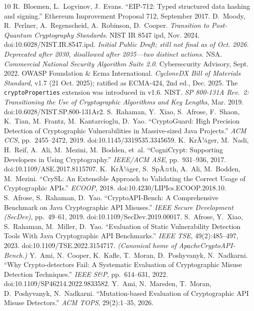 \documentclass[conference]{IEEEtran}
\newcommand{\code}[1]{\texttt{\small #1}}
\begin{document}
\begin{thebibliography}{10}
 R.~Bloemen, L.~Logvinov, J.~Evans. ``EIP-712: Typed structured data
hashing and signing.'' Ethereum Improvement Proposal 712, September 2017.
 D.~Moody, R.~Perlner, A.~Regenscheid, A.~Robinson, D.~Cooper.
\emph{Transition to Post-Quantum Cryptography Standards}. NIST IR 8547 ipd, Nov. 2024.
doi:10.6028/NIST.IR.8547.ipd. \textit{Initial Public Draft; still not final as of
Oct. 2026. Deprecated after 2030, disallowed after 2035---two distinct actions.}
 NSA. \emph{Commercial National Security Algorithm Suite 2.0}.
Cybersecurity Advisory, Sept. 2022.
 OWASP Foundation \& Ecma International. \emph{CycloneDX Bill of
Materials Standard}, v1.7 (21 Oct. 2025); ratified as ECMA-424, 2nd ed., Dec. 2025.
The \code{cryptoProperties} extension was introduced in v1.6.
 NIST. \emph{SP 800-131A Rev.~2: Transitioning the Use of Cryptographic
Algorithms and Key Lengths}, Mar. 2019. doi:10.6028/NIST.SP.800-131Ar2.
 S.~Rahaman, Y.~Xiao, S.~Afrose, F.~Shaon, K.~Tian, M.~Frantz,
M.~Kantarcioglu, D.~Yao. ``CryptoGuard: High Precision Detection of Cryptographic
Vulnerabilities in Massive-sized Java Projects.'' \emph{ACM CCS}, pp.~2455--2472, 2019.
doi:10.1145/3319535.3345659.
 K.~KrÃ¼ger, M.~Nadi, H.~Reif, A.~Ali, M.~Mezini, M.~Bodden, et~al.
``CogniCrypt: Supporting Developers in Using Cryptography.'' \emph{IEEE/ACM ASE},
pp.~931--936, 2017. doi:10.1109/ASE.2017.8115707.
 K.~KrÃ¼ger, S.~SpÃ¤th, A.~Ali, M.~Bodden, M.~Mezini. ``CrySL: An Extensible
Approach to Validating the Correct Usage of Cryptographic APIs.'' \emph{ECOOP}, 2018.
doi:10.4230/LIPIcs.ECOOP.2018.10.
 S.~Afrose, S.~Rahaman, D.~Yao. ``CryptoAPI-Bench: A Comprehensive
Benchmark on Java Cryptographic API Misuses.'' \emph{IEEE Secure Development (SecDev)},
pp.~49--61, 2019. doi:10.1109/SecDev.2019.00017.
 S.~Afrose, Y.~Xiao, S.~Rahaman, M.~Miller, D.~Yao. ``Evaluation of
Static Vulnerability Detection Tools With Java Cryptographic API Benchmarks.''
\emph{IEEE TSE}, 49(2):485--497, 2023. doi:10.1109/TSE.2022.3154717.
\textit{(Canonical home of ApacheCryptoAPI-Bench.)}
 Y.~Ami, N.~Cooper, K.~Kafle, T.~Moran, D.~Poshyvanyk, N.~Nadkarni.
``Why Crypto-detectors Fail: A Systematic Evaluation of Cryptographic Misuse Detection
Techniques.'' \emph{IEEE S\&P}, pp.~614--631, 2022. doi:10.1109/SP46214.2022.9833582.
 Y.~Ami, N.~Marsden, T.~Moran, D.~Poshyvanyk, N.~Nadkarni. ``Mutation-based
Evaluation of Cryptographic API Misuse Detectors.'' \emph{ACM TOPS}, 29(2):1--35, 2026.

\end{thebibliography}
\end{document}
